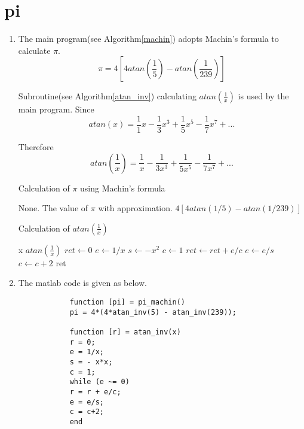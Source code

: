 \documentclass[paper=a4, fontsize=11pt]{scrartcl} %
\numberwithin{equation}{section} %
\numberwithin{figure}{section} %
\numberwithin{table}{section} %
\begin{document}
\section{pi}
\begin{enumerate}
	\item 
		The main program(see Algorithm\ref{machin}) adopts Machin's formula to calculate $\pi$.
		\begin{equation}
			\pi = 4[4atan(\frac{1}{5}) - atan(\frac{1}{239})]
		\end{equation}
		
		Subroutine(see Algorithm\ref{atan_inv}) calculating $atan(\frac{1}{x})$ is used by the main program. Since
		\begin{equation}
			atan(x) = \frac{1}{1}x - \frac{1}{3}x^3 + \frac{1}{5}x^5 - \frac{1}{7} x^7 + ...
		\end{equation}
		
		Therefore
		\begin{equation}
			atan(\frac{1}{x}) = \frac{1}{x} - \frac{1}{3x^3} + \frac{1}{5x^5} - \frac{1}{7x^7} + ...
		\end{equation}		
		
		\begin{algorithm}
			\caption{Calculation of $\pi$ using Machin's formula}  
			\label{machin}
			\begin{algorithmic}[1]
				\REQUIRE
				None.
				\ENSURE
				The value of $\pi$ with approximation.
				\RETURN $4[4 atan(1/5) - atan(1/239)]$
			\end{algorithmic}  
		\end{algorithm}
		
		\begin{algorithm}
			\caption{Calculation of $atan(\frac{1}{x})$}
			\label{atan_inv}
			\begin{algorithmic}[1]
				\REQUIRE x
				\ENSURE $atan(\frac{1}{x})$
				\STATE $ret \gets 0$
				\STATE $e \gets 1/x$
				\STATE $s \gets - x^2$
				\STATE $c \gets 1$
				\WHILE {$e \neq 0$}
				\STATE $ret \gets ret + e/c$
				\STATE $e \gets e/s$
				\STATE $c \gets c + 2$
				\ENDWHILE
				\RETURN ret
			\end{algorithmic}  
		\end{algorithm}
	
	\newpage
	
	\item
		The matlab code is given as below.
		\begin{verbatim}
			function [pi] = pi_machin()
			pi = 4*(4*atan_inv(5) - atan_inv(239));
			
			function [r] = atan_inv(x)
			r = 0;
			e = 1/x;
			s = - x*x;
			c = 1;
			while (e ~= 0)
			r = r + e/c;
			e = e/s;
			c = c+2;
			end
		\end{verbatim}	
\end{enumerate}


\end{document}
